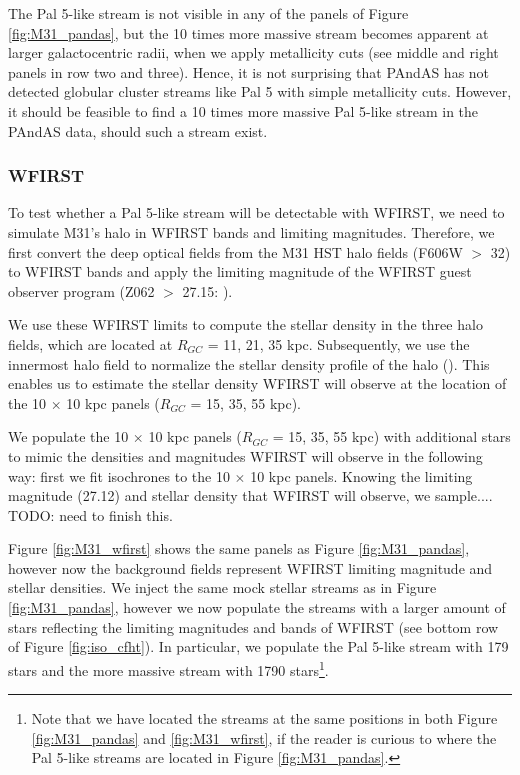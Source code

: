 \documentclass[twocolumn]{aastex62}
\newcommand{\todo}[1]{{\color{red} TODO: #1}}
\begin{document}
The Pal 5-like stream is not visible in any of the panels of Figure \ref{fig:M31_pandas}, but the 10 times more massive stream becomes apparent at larger galactocentric radii, when we apply metallicity cuts (see middle and right panels in row two and three). Hence, it is not surprising that PAndAS has not detected globular cluster streams like Pal 5 with simple metallicity cuts. However, it should be feasible to find a 10 times more massive Pal 5-like stream in the PAndAS data, should such a stream exist.

\subsubsection{WFIRST}
\label{sec:WFIRST}
To test whether a Pal 5-like stream will be detectable with WFIRST, we need to simulate M31's halo in WFIRST bands and limiting magnitudes. Therefore, we first convert the deep optical fields from the \citealt{brown09} M31 HST halo fields (F606W $>$ 32) to WFIRST bands and apply the limiting magnitude of the WFIRST guest observer program (Z062 $>$ 27.15: \citealt{spergel13}). 

We use these WFIRST limits to compute the stellar density in the three \citet{brown09} halo fields, which are located at $R_{GC}$ = 11, 21, 35 kpc. Subsequently, we use the innermost \citet{brown09} halo field to normalize the stellar density profile of the halo (\citealt{ibata07}). This enables us to estimate the stellar density WFIRST will observe at the location of the 10 $\times$ 10 kpc panels ($R_{GC}$ = 15, 35, 55 kpc).

We populate the 10 $\times$ 10 kpc panels ($R_{GC}$ = 15, 35, 55 kpc) with additional stars to mimic the densities and magnitudes WFIRST will observe in the following way: first we fit isochrones to the 10 $\times$ 10 kpc panels. Knowing the limiting magnitude (27.12) and stellar density that  WFIRST will observe, we sample....\todo{need to finish this}. 

Figure \ref{fig:M31_wfirst} shows the same panels as Figure \ref{fig:M31_pandas}, however now the background fields represent WFIRST limiting magnitude and stellar densities. We inject the same mock stellar streams as in Figure \ref{fig:M31_pandas}, however we now populate the streams with a larger amount of stars reflecting the limiting magnitudes and bands of WFIRST (see bottom row of Figure \ref{fig:iso_cfht}). In particular, we populate the Pal 5-like stream with 179 stars and the more massive stream with 1790 stars\footnote{Note that we have located the streams at the same positions in both Figure \ref{fig:M31_pandas} and \ref{fig:M31_wfirst}, if the reader is curious to where the Pal 5-like streams are located in Figure  \ref{fig:M31_pandas}.}.
\end{document}
